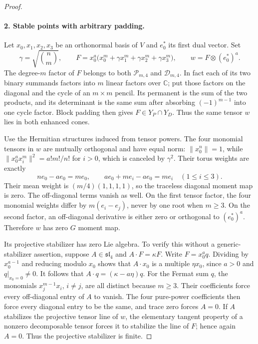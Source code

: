 \documentclass[11pt,a4paper]{article}
\theoremstyle{definition}\newtheorem{definition}{Definition}
\begin{document}
\begin{proof}
\paragraph{2. Stable points with arbitrary padding.}
Let $x_0,x_1,x_2,x_3$ be an orthonormal basis of $V$ and
$e_0^*$ its first dual vector. Set
\[
 \gamma=\sqrt{\binom{n}{m}},\qquad
 F=x_0^a\bigl(x_0^m+\gamma x_1^m+
                         \gamma x_2^m+\gamma x_3^m\bigr),
 \qquad w=F\otimes(e_0^*)^a.
\]
The degree-$m$ factor of $F$ belongs to both
$\mathcal P_{m,4}$ and $\mathcal D_{m,4}$. In fact each of its two
binary summands factors into $m$ linear factors over $\mathbb C$;
put those factors on the diagonal and the cycle of an $m\times m$
pencil. Its permanent is the sum of the two products, and its
determinant is the same sum after absorbing $(-1)^{m-1}$ into one
cycle factor. Block padding then gives $F\in Y_P\cap Y_D$.
Thus the same tensor $w$ lies in both enhanced cones.

Use the Hermitian structures induced from tensor powers. The four
monomial tensors in $w$ are mutually orthogonal and have equal norm:
$\|x_0^n\|=1$, while
$\|x_0^a x_i^m\|^2=a!m!/n!$ for $i>0$, which is canceled by
$\gamma^2$. Their torus weights are exactly
\[
 ne_0-ae_0=me_0,\qquad
 ae_0+me_i-ae_0=me_i\quad(1\leq i\leq3).
\]
Their mean weight is $(m/4)(1,1,1,1)$, so the traceless diagonal
moment map is zero. The off-diagonal terms vanish as well. On the
first tensor factor, the four monomial weights differ by
$m(e_i-e_j)$, never by one root when $m\geq3$. On the second
factor, an off-diagonal derivative is either zero or orthogonal
to $(e_0^*)^a$. Therefore $w$ has zero $G$ moment map.

Its projective stabilizer has zero Lie algebra. To verify this
without a generic-stabilizer assertion, suppose
$A\in\mathfrak{sl}_4$ and $A\cdot F=\kappa F$.
Write $F=x_0^a q$. Dividing by $x_0^{a-1}$ and reducing modulo
$x_0$ shows that $A\cdot x_0$ is a multiple $\eta x_0$, since
$a>0$ and $q|_{x_0=0}\ne0$. It follows that
$A\cdot q=(\kappa-a\eta)q$.
For the Fermat sum $q$, the monomials $x_j^{m-1}x_i$, $i\ne j$,
are all distinct because $m\geq3$. Their coefficients force every
off-diagonal entry of $A$ to vanish. The four pure-power coefficients
then force every diagonal entry to be the same, and trace zero
forces $A=0$. If $A$ stabilizes the projective tensor line of $w$,
the elementary tangent property of a nonzero decomposable tensor
forces it to stabilize the line of $F$; hence again $A=0$.
Thus the projective stabilizer is finite.


\end{proof}
\end{document}
